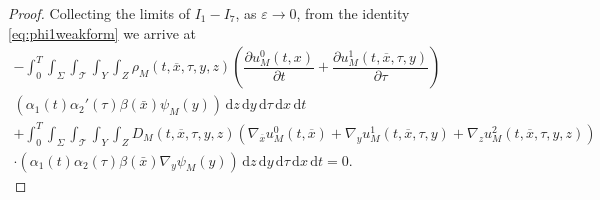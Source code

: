 \documentclass[11pt]{article}
\def\es{\varepsilon}
\def\p{\partial}
\def\T{\mathcal{T}}
\newcommand{\di}[1]{\,\mathrm{d}#1}
\begin{document}
\begin{proof}
Collecting the limits of $I_1-I_7$, as $\es\rightarrow 0$, from the identity \eqref{eq:phi1weakform} we arrive at
\begin{multline*}
     -\int_0^T\int_{\Sigma}\int_\T\int_{Y}\int_Z  {\rho_M(t,\overline{x},\tau,y,z)} \left(\dfrac{\partial u_M^0(t,x)}{\partial t}+ \dfrac{\partial u_M^1(t,\overline{x},\tau,y)}{\partial \tau}\right) \\ ( \alpha_1(t)\alpha_2'(\tau)\beta(\bar x) \psi_M(y))\di{z}\di{y}\di{\tau}\di{x}\di{t}\\
     +\int_0^T\int_{\Sigma}\int_\T\int_{Y}\int_Z   D_M(t,\overline{x},\tau,y,z)
    \left( \nabla_{\overline{x}}u_M^0(t,\overline{x})+\nabla_y u_M^1(t,\overline{x},\tau,y)+\nabla_zu_M^2(t,\overline{x},\tau,y,z)\right)\\
    \cdot ( \alpha_1(t)\alpha_2(\tau)\beta(\bar x) \nabla_y\psi_M(y)) \di{z}\di{y}\di{\tau}\di{x}\di{t}=0.
\end{multline*}


\end{proof}
\end{document}
